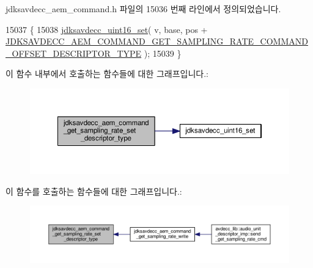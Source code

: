 jdksavdecc\+\_\+aem\+\_\+command.\+h 파일의 15036 번째 라인에서 정의되었습니다.


\begin{DoxyCode}
15037 \{
15038     \hyperlink{group__endian_ga14b9eeadc05f94334096c127c955a60b}{jdksavdecc\_uint16\_set}( v, base, pos + 
      \hyperlink{group__command__get__sampling__rate_ga133de4a2ba42bd2704863a68f74abcd3}{JDKSAVDECC\_AEM\_COMMAND\_GET\_SAMPLING\_RATE\_COMMAND\_OFFSET\_DESCRIPTOR\_TYPE}
       );
15039 \}
\end{DoxyCode}


이 함수 내부에서 호출하는 함수들에 대한 그래프입니다.\+:
\nopagebreak
\begin{figure}[H]
\begin{center}
\leavevmode
\includegraphics[width=350pt]{group__command__get__sampling__rate_ga347f9dd47644afa06af13c234ff2397e_cgraph}
\end{center}
\end{figure}




이 함수를 호출하는 함수들에 대한 그래프입니다.\+:
\nopagebreak
\begin{figure}[H]
\begin{center}
\leavevmode
\includegraphics[width=350pt]{group__command__get__sampling__rate_ga347f9dd47644afa06af13c234ff2397e_icgraph}
\end{center}
\end{figure}


